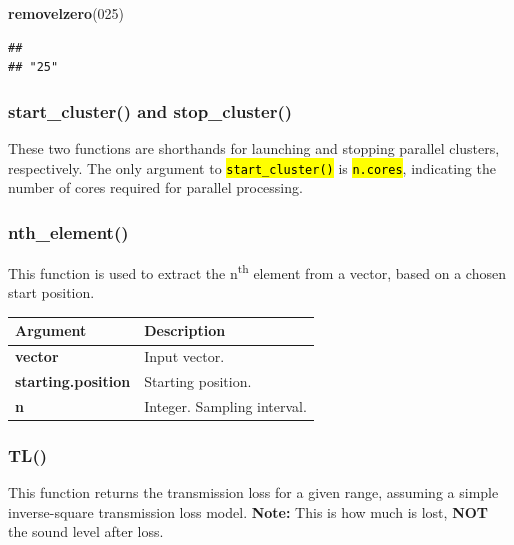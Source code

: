\documentclass[
]{article}
\newenvironment{Shaded}{\begin{snugshade}}{\end{snugshade}}
\newcommand{\DecValTok}[1]{\textcolor[rgb]{0.00,0.00,0.81}{#1}}
\newcommand{\KeywordTok}[1]{\textcolor[rgb]{0.13,0.29,0.53}{\textbf{#1}}}
\newcommand{\NormalTok}[1]{#1}
\begin{document}
\begin{Shaded}
\begin{Highlighting}[]
\KeywordTok{removelzero}\NormalTok{(}\DecValTok{025}\NormalTok{)}
\end{Highlighting}
\end{Shaded}

\begin{verbatim}
##      
## "25"
\end{verbatim}

\subsubsection{start\_cluster() and stop\_cluster()}

These two functions are shorthands for launching and stopping parallel clusters, respectively. The only argument to \textcolor{codecolor}{\texttt{\hl{start\_cluster()}}} is \textcolor{codecolor}{\texttt{\hl{n.cores}}}, indicating the number of cores required for parallel processing.

\subsubsection{nth\_element()}

This function is used to extract the n\textsuperscript{th} element from a vector, based on a chosen start position.

\renewcommand{\arraystretch}{1.4}
\begin{table}[H]
\centering
\begin{tabular}{>{\bfseries}l|>{\raggedright\arraybackslash}p{30em}}
\toprule
\textbf{Argument} & \textbf{Description}\\
\midrule
vector & Input vector.\\
starting.position & Starting position.\\
n & Integer. Sampling interval.\\
\bottomrule
\end{tabular}
\end{table}

\subsubsection{TL()}

This function returns the transmission loss for a given range, assuming a simple inverse-square transmission loss model. \textbf{Note:} This is how much is lost, \textbf{NOT} the sound level after loss.
\end{document}
